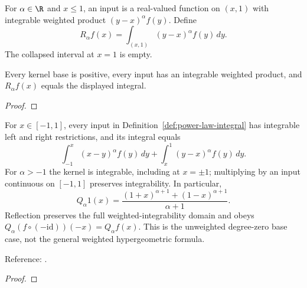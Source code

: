 \begin{supporting}
\begin{definition}
\label{def:power-law-right}
\leanok
For $\alpha\in\R$ and $x\le1$, an input is a real-valued function on $(x,1)$
with integrable weighted product $(y-x)^\alpha f(y)$. Define
\[R_\alpha f(x)=\int_{(x,1)}(y-x)^\alpha f(y)\,dy.\]
The collapsed interval at $x=1$ is empty.
\end{definition}
\begin{theorem}
\label{thm:power-law-right}
\leanok
Every kernel base is positive, every input has an integrable weighted product,
and $R_\alpha f(x)$ equals the displayed integral.
\end{theorem}
\begin{proof}
\leanok
\end{proof}
\end{supporting}


\begin{theorem}
\label{thm:power-law-basic}
\leanok
For $x\in[-1,1]$, every input in Definition~\ref{def:power-law-integral}
has integrable left and right restrictions, and its integral equals
\[
 \int_{-1}^x(x-y)^\alpha f(y)\,dy+
 \int_x^1(y-x)^\alpha f(y)\,dy.
\]
For $\alpha>-1$ the kernel is integrable, including at $x=\pm1$; multiplying by
an input continuous on $[-1,1]$ preserves integrability. In particular,
\[
 Q_\alpha1(x)=\frac{(1+x)^{\alpha+1}+(1-x)^{\alpha+1}}{\alpha+1}.
\]
Reflection preserves the full weighted-integrability domain and obeys
$Q_\alpha(f\circ(-\mathrm{id}))(-x)=Q_\alpha f(x)$.
This is the unweighted degree-zero base case, not the general weighted
hypergeometric formula.

Reference: \cite[Section 2]{gutleb-carrillo-olver}.
\end{theorem}
\begin{proof}
\leanok
\end{proof}

